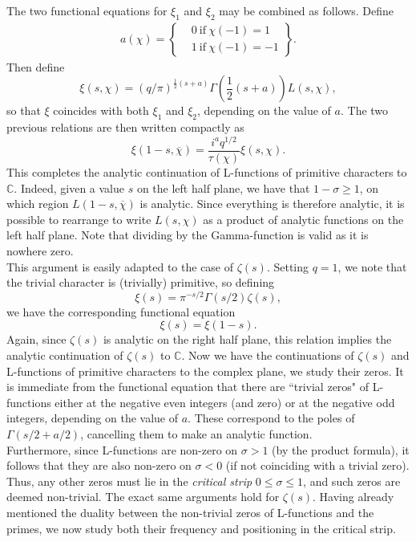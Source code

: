 The two functional equations for $\xi_1$ and $\xi_2$ may be combined as follows. Define 
\begin{align}
a(\chi) = \left\{
    \begin{array}{ll}
         &  0 \ \textrm{if} \ \chi(-1) = 1\\
         &  1 \ \textrm{if} \ \chi(-1) = -1
    \end{array}
    \right\}.
    \nonumber
\end{align}
Then define 
\begin{equation}
    \xi(s, \chi) = (q/\pi)^{\frac12(s + a)} \Gamma\left(\frac12 (s + a) \right) L(s, \chi), \nonumber
\end{equation}
so that $\xi$ coincides with both $\xi_1$ and $\xi_2$, depending on the value of $a$. The two previous relations are then written compactly as
\begin{equation}
    \xi(1-s, \overline{\chi}) =  \frac{i^{a}q^{1/2}}{\tau(\chi)} \xi(s, \chi). \nonumber
\end{equation}
This completes the analytic continuation of L-functions of primitive characters to $\mathbb{C}$. Indeed, given a value $s$ on the left half plane, we have that $1-\sigma \geq 1$, on which region $L(1-s, \overline{\chi})$ is analytic. Since everything is therefore analytic, it is possible to rearrange to write $L(s, \chi)$ as a product of analytic functions on the left half plane. Note that dividing by the Gamma-function is valid as it is nowhere zero. \\

This argument is easily adapted to the case of $\zeta(s)$. Setting $q = 1$, we note that the trivial character is (trivially) primitive, so defining
\begin{equation}
    \xi(s) = \pi^{-s/2}\Gamma(s/2)\zeta(s), \nonumber
\end{equation}
we have the corresponding functional equation
\begin{equation}
    \xi(s) = \xi(1-s). \nonumber
\end{equation}
Again, since $\zeta(s)$ is analytic on the right half plane, this relation implies the analytic continuation of $\zeta(s)$ to $\mathbb{C}$. Now we have the continuations of $\zeta(s)$ and L-functions of primitive characters to the complex plane, we study their zeros. It is immediate from the functional equation that there are ``trivial zeros" of L-functions either at the negative even integers (and zero) or at the negative odd integers, depending on the value of $a$. These correspond to the poles of $\Gamma(s/2 + a/2)$, cancelling them to make an analytic function. \\

Furthermore, since L-functions are non-zero on $\sigma > 1$ (by the product formula), it follows that they are also non-zero on $\sigma < 0$ (if not coinciding with a trivial zero). Thus, any other zeros must lie in the \textit{critical strip} $0 \leq \sigma \leq 1$, and such zeros are deemed non-trivial. The exact same arguments hold for $\zeta(s)$. Having already mentioned the duality between the non-trivial zeros of L-functions and the primes, we now study both their frequency and positioning in the critical strip.